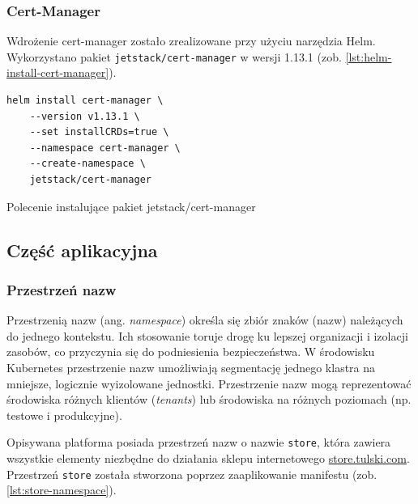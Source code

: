 \subsubsection{Cert-Manager}\label{subsubsec:cert-manager-impl}

Wdrożenie cert-manager zostało zrealizowane przy użyciu narzędzia Helm.
Wykorzystano pakiet \texttt{jetstack/cert-manager} w wersji 1.13.1 (zob. \autoref{lst:helm-install-cert-manager}).

\begin{listing}[H]
    \begin{verbatim}
helm install cert-manager \
    --version v1.13.1 \
    --set installCRDs=true \
    --namespace cert-manager \
    --create-namespace \
    jetstack/cert-manager
    \end{verbatim}
    \caption{Polecenie instalujące pakiet jetstack/cert-manager}
    \label{lst:helm-install-cert-manager}
\end{listing}

%

\newpage

\subsection{Część aplikacyjna}\label{subsec:store}

\subsubsection{Przestrzeń nazw}

Przestrzenią nazw (ang. \emph{namespace}) określa się zbiór znaków (nazw) należących do jednego kontekstu.
Ich stosowanie toruje drogę ku lepszej organizacji i izolacji zasobów, co przyczynia się do podniesienia bezpieczeństwa.
W środowisku Kubernetes przestrzenie nazw umożliwiają segmentację jednego klastra na mniejsze, logicznie wyizolowane jednostki.
Przestrzenie nazw mogą reprezentować środowiska różnych klientów (\emph{tenants}) lub środowiska na różnych poziomach (np. testowe i produkcyjne).

Opisywana platforma posiada przestrzeń nazw o nazwie \texttt{store}, która zawiera wszystkie elementy niezbędne do działania sklepu internetowego \url{store.tulski.com}.
Przestrzeń \texttt{store} została stworzona poprzez zaaplikowanie manifestu (zob. \autoref{lst:store-namespace}).

